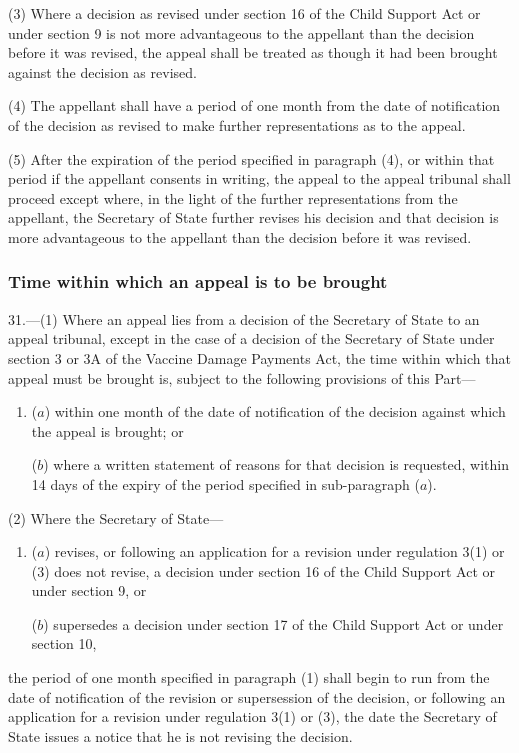 \documentclass[12pt,a4paper]{article}
\begin{document}
(3) Where a decision as revised under section 16 of the Child Support Act or under section 9 is not more advantageous to the appellant than the decision before it was revised, the appeal shall be treated as though it had been brought against the decision as revised.

(4) The appellant shall have a period of one month from the date of notification of the decision as revised to make further representations as to the appeal.

(5) After the expiration of the period specified in paragraph (4), or within that period if the appellant consents in writing, the appeal to the appeal tribunal shall proceed except where, in the light of the further representations from the appellant, the Secretary of State further revises his decision and that decision is more advantageous to the appellant than the decision before it was revised.

\subsubsection[31. Time within which an appeal is to be brought]{Time within which an appeal is to be brought}

31.—(1) Where an appeal lies from a decision of the Secretary of State to an appeal tribunal, except in the case of a decision of the Secretary of State under section 3 or 3A of the Vaccine Damage Payments Act, the time within which that appeal must be brought is, subject to the following provisions of this Part—
\begin{enumerate}\item[]
($a$) within one month of the date of notification of the decision against which the appeal is brought; or

($b$) where a written statement of reasons for that decision is requested, within 14 days of the expiry of the period specified in sub-paragraph ($a$).
\end{enumerate}

(2) Where the Secretary of State—
\begin{enumerate}\item[]
($a$) revises, or following an application for a revision under regulation 3(1) or (3) does not revise, a decision under section 16 of the Child Support Act or under section 9, or

($b$) supersedes a decision under section 17 of the Child Support Act or under section 10,
\end{enumerate}
the period of one month specified in paragraph (1) shall begin to run from the date of notification of the revision or supersession of the decision, or following an application for a revision under regulation 3(1) or (3), the date the Secretary of State issues a notice that he is not revising the decision.
\end{document}
